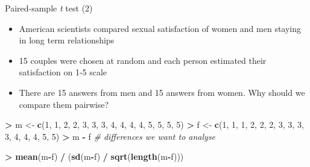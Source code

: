 \documentclass[
  ignorenonframetext,
]{beamer}
\newenvironment{Shaded}{\begin{snugshade}}{\end{snugshade}}
\newcommand{\CommentTok}[1]{\textcolor[rgb]{0.56,0.35,0.01}{\textit{#1}}}
\newcommand{\DecValTok}[1]{\textcolor[rgb]{0.00,0.00,0.81}{#1}}
\newcommand{\FunctionTok}[1]{\textcolor[rgb]{0.13,0.29,0.53}{\textbf{#1}}}
\newcommand{\NormalTok}[1]{#1}
\newcommand{\OtherTok}[1]{\textcolor[rgb]{0.56,0.35,0.01}{#1}}
\newcommand{\SpecialCharTok}[1]{\textcolor[rgb]{0.81,0.36,0.00}{\textbf{#1}}}
\providecommand{\tightlist}{%
  \setlength{\itemsep}{0pt}\setlength{\parskip}{0pt}}
\begin{document}
\begin{frame}[fragile]{Paired-sample \emph{t} test (2)}
\label{paired-sample-t-test-2}
\begin{itemize}
\tightlist
\item
  American scientists compared sexual satisfaction of women and men
  staying in long term relationships
\item
  15 couples were chosen at random and each person estimated their
  satisfaction on 1-5 scale
\item
  There are 15 answers from men and 15 answers from women. Why should we
  compare them pairwise?
\end{itemize}

\begin{Shaded}
\begin{Highlighting}[]
\SpecialCharTok{\textgreater{}}\NormalTok{ m }\OtherTok{\textless{}{-}} \FunctionTok{c}\NormalTok{(}\DecValTok{1}\NormalTok{, }\DecValTok{1}\NormalTok{, }\DecValTok{2}\NormalTok{, }\DecValTok{2}\NormalTok{, }\DecValTok{3}\NormalTok{, }\DecValTok{3}\NormalTok{, }\DecValTok{3}\NormalTok{, }\DecValTok{4}\NormalTok{, }\DecValTok{4}\NormalTok{, }\DecValTok{4}\NormalTok{, }\DecValTok{4}\NormalTok{, }\DecValTok{5}\NormalTok{, }\DecValTok{5}\NormalTok{, }\DecValTok{5}\NormalTok{, }\DecValTok{5}\NormalTok{)}
\SpecialCharTok{\textgreater{}}\NormalTok{ f }\OtherTok{\textless{}{-}} \FunctionTok{c}\NormalTok{(}\DecValTok{1}\NormalTok{, }\DecValTok{1}\NormalTok{, }\DecValTok{1}\NormalTok{, }\DecValTok{2}\NormalTok{, }\DecValTok{2}\NormalTok{, }\DecValTok{2}\NormalTok{, }\DecValTok{3}\NormalTok{, }\DecValTok{3}\NormalTok{, }\DecValTok{3}\NormalTok{, }\DecValTok{3}\NormalTok{, }\DecValTok{4}\NormalTok{, }\DecValTok{4}\NormalTok{, }\DecValTok{4}\NormalTok{, }\DecValTok{5}\NormalTok{, }\DecValTok{5}\NormalTok{)}
\SpecialCharTok{\textgreater{}}\NormalTok{ m }\SpecialCharTok{{-}}\NormalTok{ f }\CommentTok{\# differences we want to analyse}
\end{Highlighting}
\end{Shaded}

\begin{Shaded}
\begin{Highlighting}[]
\SpecialCharTok{\textgreater{}} \FunctionTok{mean}\NormalTok{(m}\SpecialCharTok{{-}}\NormalTok{f) }\SpecialCharTok{/}\NormalTok{ (}\FunctionTok{sd}\NormalTok{(m}\SpecialCharTok{{-}}\NormalTok{f) }\SpecialCharTok{/} \FunctionTok{sqrt}\NormalTok{(}\FunctionTok{length}\NormalTok{(m}\SpecialCharTok{{-}}\NormalTok{f)))}
\end{Highlighting}
\end{Shaded}
\end{frame}
\end{document}
